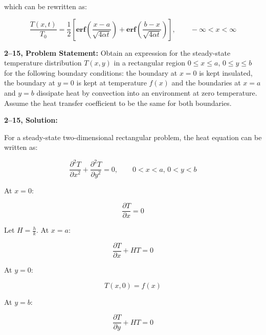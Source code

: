 \documentclass[letterpaper,12pt]{article}
\begin{document}
which can be rewritten as:

\begin{equation}
\boxed{
    \frac{T(x, t)}{T_0} = \frac{1}{2} \left[ \mathbf{erf} \left( \frac{x - a}{\sqrt{4 \alpha t}} \right) + \mathbf{erf} \left( \frac{b - x}{\sqrt{4 \alpha t}} \right)\right], \qquad -\infty < x < \infty
}
\end{equation}

\vspace{6pt}


\textbf{2--15, Problem Statement:}
Obtain an expression for the steady-state temperature distribution $T \left( x, y \right)$ in a rectangular region $0 \leq x \leq a$, $0 \leq y \leq b$ for the following boundary conditions: the boundary at $x = 0$ is kept insulated, the boundary at $y = 0$ is kept at temperature $f \left( x \right)$ and the boundaries at $x = a$ and $y = b$ dissipate heat by convection into an environment at zero temperature. Assume the heat transfer coefficient to be the same for both boundaries.

\vspace{6pt}

\textbf{2--15, Solution:}

For a steady-state two-dimensional rectangular problem, the heat equation can be written as:

\begin{equation}
    \frac{\partial^2 T}{\partial x^2} + \frac{\partial^2 T}{\partial y^2} = 0, \qquad 0 < x < a, \, 0 < y < b
\end{equation}

At $x = 0$:

\begin{equation}
    \frac{\partial T}{\partial x} = 0
\end{equation}

Let $H = \frac{h}{k}$. At $x = a$:

\begin{equation}
    \frac{\partial T}{\partial x} + HT = 0
\end{equation}

At $y = 0$:

\begin{equation}
    T(x, 0) = f(x)
\end{equation}

At $y = b$:

\begin{equation}
    \frac{\partial T}{\partial y} + HT = 0
\end{equation}
\end{document}
